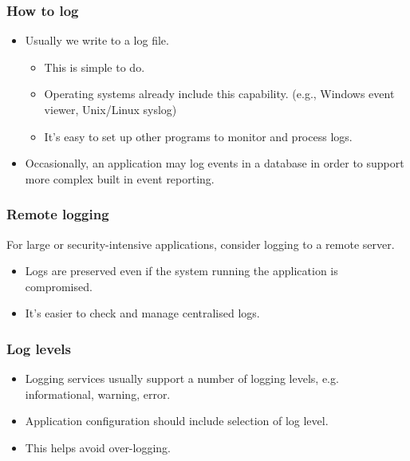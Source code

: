 \documentclass[10pt]{beamer}
\begin{document}
\begin{frame}
  \frametitle{How to log}

 \begin{itemize}
  \item Usually we write to a log file.
	  \begin{itemize} 
		  \item This is simple to do.
		  \item Operating systems already include this capability.  (e.g., Windows event viewer, Unix/Linux syslog)
		  \item It's easy to set up other programs to monitor and process logs.
	  \end{itemize}
  \item Occasionally, an application may log events in a database in order to support more complex built in event reporting.

  \end{itemize}
\end{frame}



\begin{frame}
  \frametitle{Remote logging}

  For large or security-intensive applications, consider logging to a remote server.
 \begin{itemize}
  \item Logs are preserved even if the system running the application is compromised.
  \item It's easier to check and manage centralised logs.
  \end{itemize}
\end{frame}



\begin{frame}
  \frametitle{Log levels}

 \begin{itemize}
  \item Logging services usually support a number of logging levels, e.g. informational, warning, error.
  \item Application configuration should include selection of log level.
  \item This helps avoid over-logging.
  \end{itemize}
\end{frame}
\end{document}
